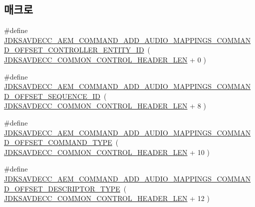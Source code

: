 \subsection*{매크로}
\begin{DoxyCompactItemize}
\item 
\#define \hyperlink{group__command__add__audio__mappings_ga613ab09599459d0502e26efa74347b40}{J\+D\+K\+S\+A\+V\+D\+E\+C\+C\+\_\+\+A\+E\+M\+\_\+\+C\+O\+M\+M\+A\+N\+D\+\_\+\+A\+D\+D\+\_\+\+A\+U\+D\+I\+O\+\_\+\+M\+A\+P\+P\+I\+N\+G\+S\+\_\+\+C\+O\+M\+M\+A\+N\+D\+\_\+\+O\+F\+F\+S\+E\+T\+\_\+\+C\+O\+N\+T\+R\+O\+L\+L\+E\+R\+\_\+\+E\+N\+T\+I\+T\+Y\+\_\+\+ID}~( \hyperlink{group__jdksavdecc__avtp__common__control__header_gaae84052886fb1bb42f3bc5f85b741dff}{J\+D\+K\+S\+A\+V\+D\+E\+C\+C\+\_\+\+C\+O\+M\+M\+O\+N\+\_\+\+C\+O\+N\+T\+R\+O\+L\+\_\+\+H\+E\+A\+D\+E\+R\+\_\+\+L\+EN} + 0 )
\item 
\#define \hyperlink{group__command__add__audio__mappings_ga6e0f9ec908bd5852683d09a492cd4c11}{J\+D\+K\+S\+A\+V\+D\+E\+C\+C\+\_\+\+A\+E\+M\+\_\+\+C\+O\+M\+M\+A\+N\+D\+\_\+\+A\+D\+D\+\_\+\+A\+U\+D\+I\+O\+\_\+\+M\+A\+P\+P\+I\+N\+G\+S\+\_\+\+C\+O\+M\+M\+A\+N\+D\+\_\+\+O\+F\+F\+S\+E\+T\+\_\+\+S\+E\+Q\+U\+E\+N\+C\+E\+\_\+\+ID}~( \hyperlink{group__jdksavdecc__avtp__common__control__header_gaae84052886fb1bb42f3bc5f85b741dff}{J\+D\+K\+S\+A\+V\+D\+E\+C\+C\+\_\+\+C\+O\+M\+M\+O\+N\+\_\+\+C\+O\+N\+T\+R\+O\+L\+\_\+\+H\+E\+A\+D\+E\+R\+\_\+\+L\+EN} + 8 )
\item 
\#define \hyperlink{group__command__add__audio__mappings_gaca65359e0ffc12ac2fc886d7992cd90c}{J\+D\+K\+S\+A\+V\+D\+E\+C\+C\+\_\+\+A\+E\+M\+\_\+\+C\+O\+M\+M\+A\+N\+D\+\_\+\+A\+D\+D\+\_\+\+A\+U\+D\+I\+O\+\_\+\+M\+A\+P\+P\+I\+N\+G\+S\+\_\+\+C\+O\+M\+M\+A\+N\+D\+\_\+\+O\+F\+F\+S\+E\+T\+\_\+\+C\+O\+M\+M\+A\+N\+D\+\_\+\+T\+Y\+PE}~( \hyperlink{group__jdksavdecc__avtp__common__control__header_gaae84052886fb1bb42f3bc5f85b741dff}{J\+D\+K\+S\+A\+V\+D\+E\+C\+C\+\_\+\+C\+O\+M\+M\+O\+N\+\_\+\+C\+O\+N\+T\+R\+O\+L\+\_\+\+H\+E\+A\+D\+E\+R\+\_\+\+L\+EN} + 10 )
\item 
\#define \hyperlink{group__command__add__audio__mappings_ga5d998c3cb4c9e758353fd3078a52fc6d}{J\+D\+K\+S\+A\+V\+D\+E\+C\+C\+\_\+\+A\+E\+M\+\_\+\+C\+O\+M\+M\+A\+N\+D\+\_\+\+A\+D\+D\+\_\+\+A\+U\+D\+I\+O\+\_\+\+M\+A\+P\+P\+I\+N\+G\+S\+\_\+\+C\+O\+M\+M\+A\+N\+D\+\_\+\+O\+F\+F\+S\+E\+T\+\_\+\+D\+E\+S\+C\+R\+I\+P\+T\+O\+R\+\_\+\+T\+Y\+PE}~( \hyperlink{group__jdksavdecc__avtp__common__control__header_gaae84052886fb1bb42f3bc5f85b741dff}{J\+D\+K\+S\+A\+V\+D\+E\+C\+C\+\_\+\+C\+O\+M\+M\+O\+N\+\_\+\+C\+O\+N\+T\+R\+O\+L\+\_\+\+H\+E\+A\+D\+E\+R\+\_\+\+L\+EN} + 12 )

\end{DoxyCompactItemize}
